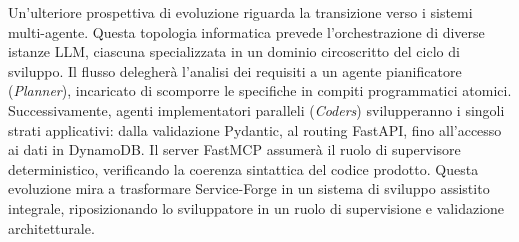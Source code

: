Un'ulteriore prospettiva di evoluzione riguarda la transizione verso i sistemi multi-agente. Questa topologia informatica prevede l'orchestrazione di diverse istanze LLM, ciascuna specializzata in un dominio circoscritto del ciclo di sviluppo. Il flusso delegherà l'analisi dei requisiti a un agente pianificatore (\emph{Planner}), incaricato di scomporre le specifiche in compiti programmatici atomici. Successivamente, agenti implementatori paralleli (\emph{Coders}) svilupperanno i singoli strati applicativi: dalla validazione Pydantic, al routing FastAPI, fino all'accesso ai dati in DynamoDB. Il server FastMCP assumerà il ruolo di supervisore deterministico, verificando la coerenza sintattica del codice prodotto. Questa evoluzione mira a trasformare Service-Forge in un sistema di sviluppo assistito integrale, riposizionando lo sviluppatore in un ruolo di supervisione e validazione architetturale.